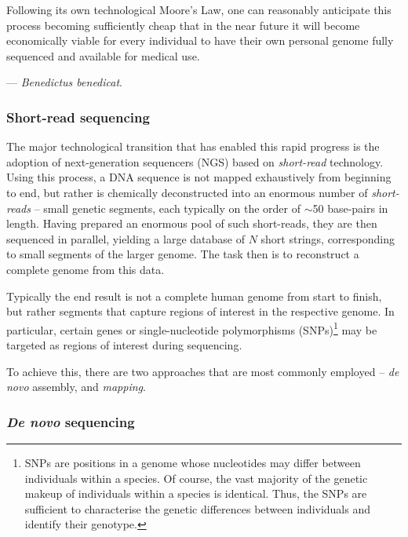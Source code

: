 Following its own technological Moore's Law, one can reasonably anticipate this process becoming sufficiently cheap that in the near future it will become economically viable for every individual to have their own personal genome fully sequenced and available for medical use.

--- \textit{Benedictus benedicat}.

%
%

\subsubsection{Short-read sequencing}

The major technological transition that has enabled this rapid progress is the adoption of next-generation sequencers (NGS) based on \textit{short-read} technology. Using this process, a DNA sequence is not mapped exhaustively from beginning to end, but rather is chemically deconstructed into an enormous number of \textit{short-reads} -- small genetic segments, each typically on the order of $\sim$50 base-pairs in length. Having prepared an enormous pool of such short-reads, they are then sequenced in parallel, yielding a large database of $N$ short strings, corresponding to small segments of the larger genome. The task then is to reconstruct a complete genome from this data.

Typically the end result is not a complete human genome from start to finish, but rather segments that capture regions of interest in the respective genome. In particular, certain genes or single-nucleotide polymorphisms (SNPs)\footnote{SNPs are positions in a genome whose nucleotides may differ between individuals within a species. Of course, the vast majority of the genetic makeup of individuals within a species is identical. Thus, the SNPs are sufficient to characterise the genetic differences between individuals and identify their genotype.} may be targeted as regions of interest during sequencing.

To achieve this, there are two approaches that are most commonly employed -- \textit{de novo} assembly, and \textit{mapping}.

%
%

\subsubsection{\textit{De novo} sequencing}

